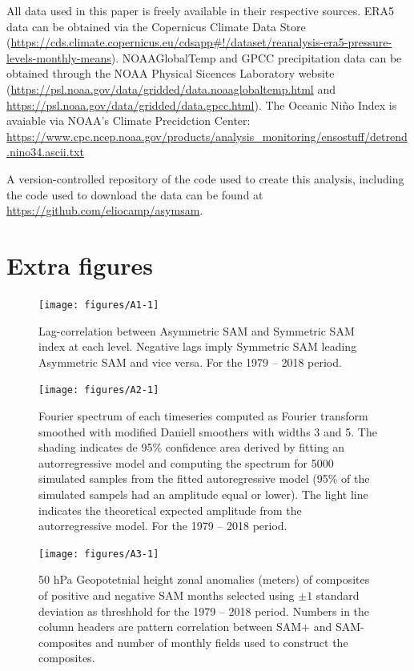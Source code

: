 \documentclass[smallextended]{svjour3}       %
\begin{document}
All data used in this paper is freely available in their respective sources. ERA5 data can be obtained via the Copernicus Climate Data Store (\url{https://cds.climate.copernicus.eu/cdsapp\#!/dataset/reanalysis-era5-pressure-levels-monthly-means}). NOAAGlobalTemp and GPCC precipitation data can be obtained through the NOAA Physical Sicences Laboratory website (\url{https://psl.noaa.gov/data/gridded/data.noaaglobaltemp.html} and \url{https://psl.noaa.gov/data/gridded/data.gpcc.html}). The Oceanic Niño Index is avaiable via NOAA's Climate Precidction Center: \url{https://www.cpc.ncep.noaa.gov/products/analysis_monitoring/ensostuff/detrend.nino34.ascii.txt}

A version-controlled repository of the code used to create this analysis, including the code used to download the data can be found at \url{https://github.com/eliocamp/asymsam}.

\newpage

\appendix


\hypertarget{extra-figures}{%
\section{Extra figures}\label{extra-figures}}

\newpage

\begin{figure}[ht]
\texttt{[image: figures/A1-1]} \caption{Lag-correlation between Asymmetric SAM and Symmetric SAM index at each level. Negative lags imply Symmetric SAM leading Asymmetric SAM and vice versa. For the 1979 -- 2018 period.}\label{fig:A1}
\end{figure}

\begin{figure}
\texttt{[image: figures/A2-1]} \caption{Fourier spectrum of each timeseries computed as Fourier transform smoothed with modified Daniell smoothers with widths 3 and 5. The shading indicates de 95\% confidence area derived by fitting an autorregressive model and computing the spectrum for 5000 simulated samples from the fitted autoregressive model (95\% of the simulated sampels had an amplitude equal or lower). The light line indicates the theoretical expected amplitude from the autorregressive model. For the 1979 -- 2018 period.}\label{fig:A2}
\end{figure}

\begin{figure}
\texttt{[image: figures/A3-1]} \caption{50 hPa Geopotetnial height zonal anomalies (meters) of composites of positive and negative SAM months selected using $\pm1$ standard deviation as threshhold for the 1979 -- 2018 period. Numbers in the column headers are pattern correlation between SAM+ and SAM- composites and number of monthly fields used to construct the composites.}\label{fig:A3}
\end{figure}
\end{document}
